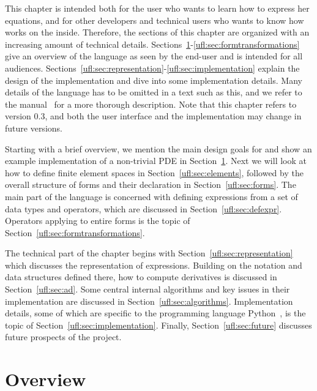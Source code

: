 This chapter is intended both for the \fenics{} user who wants to
learn how to express her equations, and for other \fenics{} developers
and technical users who wants to know how \ufl{} works on the inside.
Therefore, the sections of this chapter are organized with an
increasing amount of technical details.
Sections~\ref{ufl:sec:overview}-\ref{ufl:sec:formtransformations} give
an overview of the language as seen by the end-user and is intended
for all audiences.
Sections~\ref{ufl:sec:representation}-\ref{ufl:sec:implementation}
explain the design of the implementation and dive into some
implementation details.  Many details of the language has to be
omitted in a text such as this, and we refer to the \ufl{}
manual~\cite{manual:ufl} for a more thorough description. Note that
this chapter refers to \ufl{} version 0.3, and both the user interface
and the implementation may change in future versions.

Starting with a brief overview, we mention the main design goals for
\ufl{} and show an example implementation of a non-trivial PDE in
Section~\ref{ufl:sec:overview}.  Next we will look at how to define
finite element spaces in Section~\ref{ufl:sec:elements}, followed by
the overall structure of forms and their declaration in
Section~\ref{ufl:sec:forms}.  The main part of the language is
concerned with defining expressions from a set of data types and
operators, which are discussed in Section~\ref{ufl:sec:defexpr}.
Operators applying to entire forms is the topic of
Section~\ref{ufl:sec:formtransformations}.

The technical part of the chapter begins with
Section~\ref{ufl:sec:representation} which discusses the
representation of expressions.  Building on the notation and data
structures defined there, how to compute derivatives is discussed in
Section~\ref{ufl:sec:ad}.  Some central internal algorithms and key
issues in their implementation are discussed in
Section~\ref{ufl:sec:algorithms}.  Implementation details, some of
which are specific to the programming language
Python~\cite{Rossumothers}, is the topic of
Section~\ref{ufl:sec:implementation}.  Finally,
Section~\ref{ufl:sec:future} discusses future prospects of the \ufl{}
project.

\section{Overview} \label{ufl:sec:overview}

